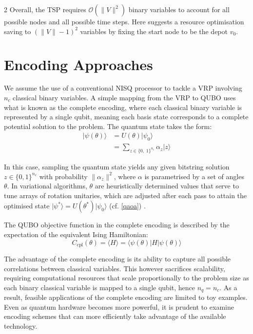 \documentclass [10pt]{article}
\newcommand {\qvec}[1] {\vert #1 \rangle}
\newcommand {\qcovec}[1] {\langle #1 \vert}
\newcommand {\qeval}[1] {\langle #1 \rangle}
\newcommand {\qnorm}[1] {\lVert #1 \rVert}
\begin{document}
\begin {multicols}{2}
Overall, the TSP requires $\mathcal{O}(\qnorm{V}^2)$ binary variables to account
for all possible nodes and all possible time steps. Here \cite{isingnp} suggests
a resource optimisation saving to $(\qnorm{V} - 1)^2$ variables by fixing the
start node to be the depot $v_0$.



\section {Encoding Approaches}
We assume the use of a conventional NISQ processor to tackle a VRP involving
$n_c$ classical binary variables. A simple mapping from the VRP to QUBO uses
what is known as the complete encoding, where each classical binary variable
is represented by a single qubit, meaning each basis state corresponds to a
complete potential solution to the problem. The quantum state takes the form:
\begin {align}
\qvec{\psi(\theta)} 
&= U(\theta)\qvec{\psi_0} \\
&= \sum_{z \in \{0, \; 1\}^{n_c}} \alpha_z \qvec{z}
\end {align}

In this case, sampling the quantum state yields any given bitstring solution
${z \in \{0, 1\}^{n_c}}$ with probability $\qnorm{\alpha_z}^2$, where
$\alpha$ is parametrised by a set of angles $\theta$. In variational
algorithms, $\theta$ are heuristically determined values that serve to tune
arrays of rotation unitaries, which are adjusted after each pass to attain
the optimised state $\qvec{\psi^*} = U(\theta^*)\qvec{\psi_0}$
(cf. \eqref{qaoa}) \cite{qaoaintro}.

The QUBO objective function in the complete encoding is described by the
expectation of the equivalent Ising Hamiltonian:
\begin {equation}
C_{\text{cpl}}(\theta) = \qeval{H} = \qcovec{\psi(\theta)} H \qvec{\psi(\theta)}
\end {equation}


The advantage of the complete encoding is its ability to capture all
possible correlations between classical variables. This however sacrifices
scalability, requiring computational resources that scale proportionally
to the problem size as each binary classical variable is mapped to a
single qubit, hence $n_q = n_c$. As a result, feasible applications of the
complete encoding are limited to toy examples. Even as quantum hardware
becomes more powerful, it is prudent to examine encoding schemes that can more
efficiently take advantage of the available technology.


\end{multicols}
\end{document}
